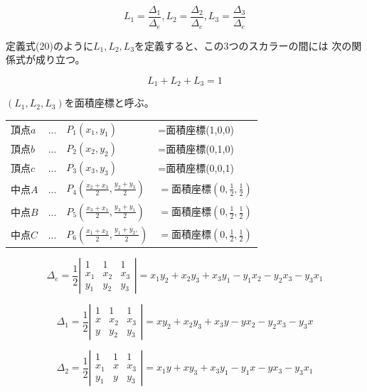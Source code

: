 \documentclass{jarticle}
\begin{document}
\begin{equation}
\displaystyle
L_1 = \frac{\Delta_1}{\Delta_e},
L_2 = \frac{\Delta_2}{\Delta_e},
L_3 = \frac{\Delta_3}{\Delta_e}
\end{equation}


定義式(20)のように$L_1, L_2, L_3$を定義すると、この3つのスカラーの間には
次の関係式が成り立つ。

\begin{equation}
\displaystyle
L_1 + L_2 + L_3 = 1
\end{equation}

$(L_1,L_2,L_3)$を面積座標と呼ぶ。



\begin{center}
\begin{tabular}{llll}
  $頂点a$&...&$P_1(x_1,y_1)$&=面積座標(1,0,0)\\
  $頂点b$&...&$P_2(x_2,y_2)$&=面積座標(0,1,0)\\
  $頂点c$&...&$P_3(x_3,y_3)$&=面積座標(0,0,1)\\
  $中点A$&...&$P_4(\frac{x_2+x_3}{2},\frac{y_2+y_3}{2})$&$=面積座標(0,\frac{1}{2},\frac{1}{2})$\\
  $中点B$&...&$P_5(\frac{x_3+x_1}{2},\frac{y_3+y_1}{2})$&$=面積座標(0,\frac{1}{2},\frac{1}{2})$\\
  $中点C$&...&$P_6(\frac{x_1+x_2}{2},\frac{y_1+y_2,}{2})$&$=面積座標(0,\frac{1}{2},\frac{1}{2})$
\end{tabular}
\end{center}


\begin{equation}
  \Delta_e = \frac{1}{2}\left|\begin{array}{ccc}
  1&1&1\\
  x_1&x_2&x_3\\
  y_1&y_2&y_3
  \end{array}\right|=x_1 y_2 + x_2 y_3 + x_3 y_1- y_1 x_2 - y_2 x_3 - y_3 x_1
\end{equation}


\begin{equation}
  \Delta_1 = \frac{1}{2}\left|\begin{array}{ccc}
  1&1&1\\
  x&x_2&x_3\\
  y&y_2&y_3
  \end{array}\right|=x y_2 + x_2 y_3 + x_3 y- y x_2 - y_2 x_3 - y_3 x
\end{equation}


\begin{equation}
  \Delta_2 = \frac{1}{2}\left|\begin{array}{ccc}
  1&1&1\\
  x_1&x&x_3\\
  y_1&y&y_3
  \end{array}\right|=x_1 y + x y_3 + x_3 y_1- y_1 x - y x_3 - y_3 x_1
\end{equation}
\end{document}
